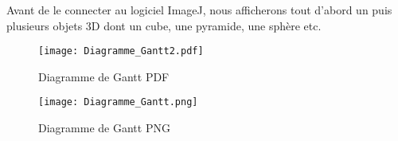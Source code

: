 \documentclass[11pt]{report}
\begin{document}
 Avant de le connecter au logiciel ImageJ, nous afficherons tout d'abord un puis plusieurs objets 3D dont un cube, une pyramide, une sphère etc.  


\begin{landscape}



 \pagestyle{empty} 

 \begin{figure}[h!]
  \caption{Diagramme de Gantt PDF}
  \hspace{-4cm}
    \texttt{[image: Diagramme\_Gantt2.pdf]}
\end{figure}
 
  \begin{figure}[h!]
 
  
  
  \caption{Diagramme de Gantt PNG}
   \hspace{-5cm}
    \texttt{[image: Diagramme\_Gantt.png]}
\end{figure}

 \end{landscape}
\end{document}
